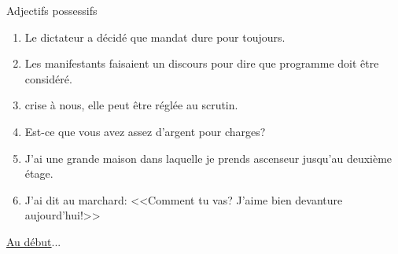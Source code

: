\begin{frame}{Adjectifs possessifs}
  \begin{enumerate}
    \item Le dictateur a décidé que \underline{} mandat dure pour toujours.
    \item Les manifestants faisaient un discours pour dire que \underline{} programme doit être considéré.
    \item \underline{} crise à nous, elle peut être réglée au scrutin.
    \item Est-ce que vous avez assez d'argent pour \underline{} charges?
    \item J'ai une grande maison dans laquelle je prends \underline{} ascenseur jusqu'au deuxième étage.
    \item J'ai dit au marchard: <<Comment tu vas? J'aime bien \underline{} devanture aujourd'hui!>>
  \end{enumerate}
  \vspace{0.25cm}
  \raggedleft\raggedleft\hyperlink{début}{Au début}...
\end{frame}